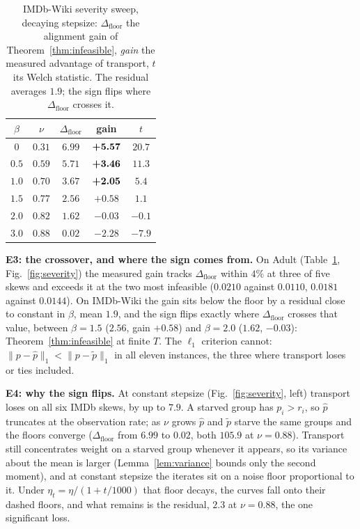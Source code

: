 \begin{table}[t]
\centering
\caption{IMDb-Wiki severity sweep, decaying stepsize: $\Delta_{\mathrm{floor}}$
the alignment gain of Theorem~\ref{thm:infeasible}, \emph{gain} the measured
advantage of transport, $t$ its Welch statistic. The residual averages $1.9$;
the sign flips where $\Delta_{\mathrm{floor}}$ crosses it.}
\label{tab:severity}
\setlength{\tabcolsep}{3.0pt}
\begin{tabular}{ccccc}
\toprule
$\beta$ & $\nu$ & $\Delta_{\mathrm{floor}}$ & gain & $t$ \\
\midrule
$0$   & $0.31$ & $6.99$ & $\textbf{+5.57}$ & $20.7$ \\
$0.5$ & $0.59$ & $5.71$ & $\textbf{+3.46}$ & $11.3$ \\
$1.0$ & $0.70$ & $3.67$ & $\textbf{+2.05}$ & $5.4$ \\
$1.5$ & $0.77$ & $2.56$ & $+0.58$ & $1.1$ \\
$2.0$ & $0.82$ & $1.62$ & $-0.03$ & $-0.1$ \\
$3.0$ & $0.88$ & $0.02$ & $-2.28$ & $-7.9$ \\
\bottomrule
\end{tabular}
\vspace{-8pt}
\end{table}

\noindent\textbf{E3: the crossover, and where the sign comes from.}
On Adult (Table~\ref{tab:severity}, Fig.~\ref{fig:severity}) the measured gain tracks $\Delta_{\mathrm{floor}}$ within $4\%$ at
three of five skews and exceeds it at the two most infeasible ($0.0210$
against $0.0110$, $0.0181$ against $0.0144$). On IMDb-Wiki the gain sits below
the floor by a residual close to constant in $\beta$, mean $1.9$, and the
sign flips exactly where $\Delta_{\mathrm{floor}}$ crosses that value,
between $\beta{=}1.5$ ($2.56$, gain $+0.58$) and $\beta{=}2.0$ ($1.62$,
$-0.03$): Theorem~\ref{thm:infeasible} at finite $T$. The $\ell_1$ criterion
cannot: $\|p-\hat p\|_1<\|p-\tilde p\|_1$ in all eleven instances, the three
where transport loses or ties included.

\noindent\textbf{E4: why the sign flips.}
At constant stepsize (Fig.~\ref{fig:severity}, left) transport loses on all
six IMDb skews, by up to $7.9$. A
starved group has $p_i>r_i$, so $\hat p$ truncates at the observation rate;
as $\nu$ grows $\hat p$ and $\tilde p$ starve the same groups and the floors
converge ($\Delta_{\mathrm{floor}}$ from $6.99$ to $0.02$, both $105.9$ at
$\nu{=}0.88$). Transport still concentrates weight on a starved
group whenever it appears, so its variance about the mean is larger
(Lemma~\ref{lem:variance} bounds only the second moment), and at constant
stepsize the iterates sit on a noise floor proportional to it. Under
$\eta_t=\eta/(1+t/1000)$ that floor decays, the curves fall onto their
dashed floors, and what remains is the residual, $2.3$ at $\nu{=}0.88$, the
one significant loss.

